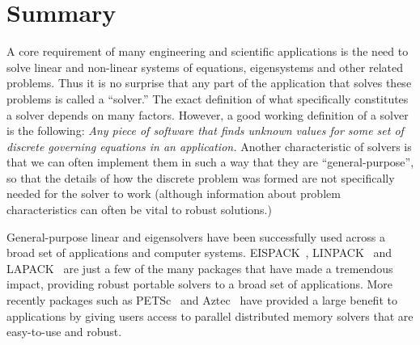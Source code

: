 \documentclass[12pt,relax]{SANDreport}
\begin{document}
    \clearpage
    \tableofcontents
    \listoffigures
    \listoftables




    \clearpage
    \section{Summary}

A core requirement of many engineering and scientific applications is the need to solve linear and non-linear 
systems of equations, eigensystems and other related problems.  Thus it is no surprise that any 
part of the application that solves these problems is called a ``solver.'' The exact definition of what
specifically constitutes a solver depends on many factors.  However, a good working definition of a solver is
the following: {\it Any piece of software that finds unknown values for some set of discrete
governing equations in 
an application.}  Another characteristic of solvers is that we can often implement them in such a way that they
are ``general-purpose'', so that the
details of how the discrete problem was formed are not specifically needed for the solver to work (although
information about problem characteristics can often be vital to robust solutions.)

General-purpose linear and eigensolvers have been successfully used across a broad set of applications and 
computer systems.  EISPACK~\cite{eispack}, LINPACK~\cite{linpack} and LAPACK~\cite{lapack} are just a few of
the many packages that have made a tremendous impact, providing robust portable solvers to a broad set of 
applications.  More recently packages such as PETSc~\cite{petsc-home-page,petsc-manual,petsc-efficient} 
and Aztec~\cite{Aztec2.1} have provided a large
benefit to applications by giving users access to parallel distributed memory solvers that are easy-to-use and
robust.
\end{document}
